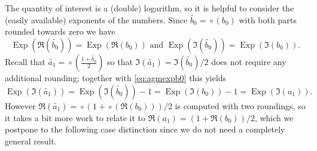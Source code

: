 \documentclass [11pt]{article}
\newcommand {\appro}[1]{\widetilde {#1}}
\DeclareMathOperator{\Exp}{\operatorname {Exp}}
\newcommand {\round}{\operatorname {\circ}}
\begin{document}
The quantity of interest is a (double) logarithm, so it is helpful to
consider the (easily available) exponents of the numbers.
Since $\appro {b_0} = \round ({b_0})$ with both parts rounded towards zero
we have
\begin {equation}
\label {eq:agmexpb0}
\Exp (\Re (\appro {b_0})) = \Exp (\Re (b_0))
\text { and }
\Exp (\Im (\appro {b_0})) = \Exp (\Im (b_0)).
\end {equation}
Recall that
$\appro {a_1} = \round \left( \frac {1 + \appro {b_0}}{2} \right)$ so that
$\Im (\appro {a_1}) = \Im (\appro {b_0}) / 2$ does not require any
additional rounding; together with \eqref {eq:agmexpb0} this yields
\begin {equation}
\label {eq:agmexpima1}
\Exp (\Im (\appro {a_1})) = \Exp (\Im (\appro {b_0})) - 1
= \Exp (\Im (b_0)) - 1 = \Exp (\Im (a_1)).
\end {equation}
However
$\Re (\appro {a_1}) = \round (1 + \round (\Re (b_0))) / 2$
is computed with two roundings, so it takes a bit more work to relate
it to $\Re (a_1) = (1 + \Re (b_0)) / 2$, which we postpone to the
following case distinction since we do not need a completely general
result.
\end{document}
